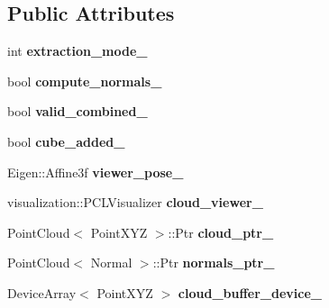 \subsection*{Public Attributes}
\begin{DoxyCompactItemize}
\item 
\hypertarget{struct_scene_cloud_view_ac613a3b8c4076cf63e5ae8bd9a18276e}{int {\bfseries extraction\+\_\+mode\+\_\+}}\label{struct_scene_cloud_view_ac613a3b8c4076cf63e5ae8bd9a18276e}

\item 
\hypertarget{struct_scene_cloud_view_a2cf11e520aecc6ff80d537dbab502010}{bool {\bfseries compute\+\_\+normals\+\_\+}}\label{struct_scene_cloud_view_a2cf11e520aecc6ff80d537dbab502010}

\item 
\hypertarget{struct_scene_cloud_view_a628fc9ce9443727daf62dad825640d10}{bool {\bfseries valid\+\_\+combined\+\_\+}}\label{struct_scene_cloud_view_a628fc9ce9443727daf62dad825640d10}

\item 
\hypertarget{struct_scene_cloud_view_a5c8c52c248c0b483420ded4ed8c3cee7}{bool {\bfseries cube\+\_\+added\+\_\+}}\label{struct_scene_cloud_view_a5c8c52c248c0b483420ded4ed8c3cee7}

\item 
\hypertarget{struct_scene_cloud_view_a4d8d93d1f530b0ff7044f09b8c5cc773}{Eigen\+::\+Affine3f {\bfseries viewer\+\_\+pose\+\_\+}}\label{struct_scene_cloud_view_a4d8d93d1f530b0ff7044f09b8c5cc773}

\item 
\hypertarget{struct_scene_cloud_view_a3a07092aaea7881881ac2c4f41cd5e90}{visualization\+::\+P\+C\+L\+Visualizer {\bfseries cloud\+\_\+viewer\+\_\+}}\label{struct_scene_cloud_view_a3a07092aaea7881881ac2c4f41cd5e90}

\item 
\hypertarget{struct_scene_cloud_view_aaee4ebfad25189d85d7c9f3265537e31}{Point\+Cloud$<$ Point\+X\+Y\+Z $>$\+::Ptr {\bfseries cloud\+\_\+ptr\+\_\+}}\label{struct_scene_cloud_view_aaee4ebfad25189d85d7c9f3265537e31}

\item 
\hypertarget{struct_scene_cloud_view_a7034a0040241e9b19d9d26282a83d4a5}{Point\+Cloud$<$ Normal $>$\+::Ptr {\bfseries normals\+\_\+ptr\+\_\+}}\label{struct_scene_cloud_view_a7034a0040241e9b19d9d26282a83d4a5}

\item 
\hypertarget{struct_scene_cloud_view_af4e1afd4cf687f03f74a053d917908ad}{Device\+Array$<$ Point\+X\+Y\+Z $>$ {\bfseries cloud\+\_\+buffer\+\_\+device\+\_\+}}\label{struct_scene_cloud_view_af4e1afd4cf687f03f74a053d917908ad}


\end{DoxyCompactItemize}
